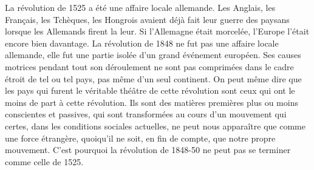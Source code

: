 \documentclass[french,twoside]{book} %
\newif\ifdev
\renewcommand{\LettrineFontHook}{\color{rubric}}
\newcommand{\initialiv}[2]{%
  \let\oldLFH\LettrineFontHook
  \IfSubStr{Q}{#1}{
    \lettrine[lines=4, lhang=0.2, loversize=-0.1, lraise=0.2]{\smash{#1}}{#2}
  }{\IfSubStr{É}{#1}{
    \lettrine[lines=4, lhang=0.2, loversize=-0, lraise=0]{\smash{#1}}{#2}
  }{\IfSubStr{ÀÂ}{#1}{
    \lettrine[lines=4, lhang=0.2, loversize=-0, lraise=0, slope=0.6em]{\smash{#1}}{#2}
  }{\IfSubStr{A}{#1}{
    \lettrine[lines=4, lhang=0.2, loversize=0.2, slope=0.6em]{\smash{#1}}{#2}
  }{\IfSubStr{V}{#1}{
    \lettrine[lines=4, lhang=0.2, loversize=0.2, slope=-0.5em]{\smash{#1}}{#2}
  }{
    \lettrine[lines=4, lhang=0.2, loversize=0.2]{\smash{#1}}{#2}
  }}}}}
  \let\LettrineFontHook\oldLFH
}
\newcommand\chapterclose{} %
\renewcommand{\LettrineFontHook}{\bfseries\color{rubric}}
\begin{document}
La révolution de 1525 a été une affaire locale allemande. Les Anglais, les Français, les Tchèques, les Hongrois avaient déjà fait leur guerre des paysans lorsque les Allemands firent la leur. Si l’Allemagne était morcelée, l’Europe l’était encore bien davantage. La révolution de 1848 ne fut pas une affaire locale allemande, elle fut une partie isolée d’un grand événement européen. Ses causes motrices pendant tout son déroulement ne sont pas comprimées dans le cadre étroit de tel ou tel pays, pas même d’un seul continent. On peut même dire que les pays qui furent le véritable théâtre de cette révolution sont ceux qui ont le moins de part à cette révolution. Ils sont des matières premières plus ou moins conscientes et passives, qui sont transformées au cours d’un mouvement qui certes, dans les conditions sociales actuelles, ne peut nous apparaître que comme une force étrangère, quoiqu’il ne soit, en fin de compte, que notre propre mouvement. C’est pourquoi la révolution de 1848-50 ne peut pas se terminer comme celle de 1525.
\chapterclose

 


\ifbooklet
  \newpage\null\thispagestyle{empty}\newpage
\fi

\ifdev %
\fontname\font — \textsc{Les règles du jeu}\par
(\hyperref[utopie]{\underline{Lien}})\par
\noindent \initialiv{A}{lors là}\blindtext\par
\noindent \initialiv{À}{ la bonheur des dames}\blindtext\par
\noindent \initialiv{É}{tonnez-le}\blindtext\par
\noindent \initialiv{Q}{ualitativement}\blindtext\par
\noindent \initialiv{V}{aloriser}\blindtext\par
\Blindtext
\phantomsection
\label{utopie}
\Blinddocument
\fi
\end{document}
